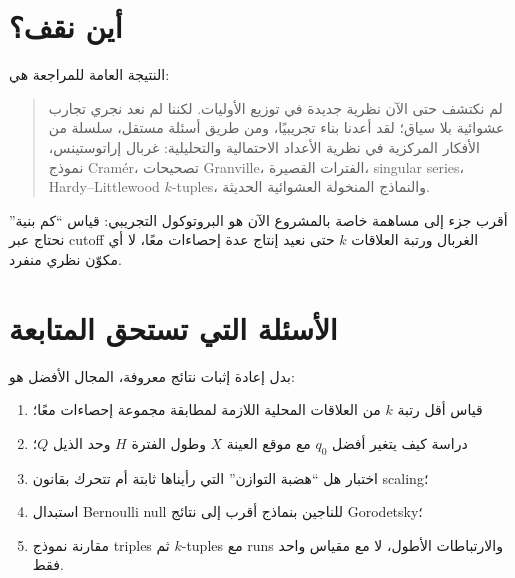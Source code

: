 \documentclass[12pt]{article}
\begin{document}
\section{أين نقف؟}
النتيجة العامة للمراجعة هي:
\begin{quote}
لم نكتشف حتى الآن نظرية جديدة في توزيع الأوليات. لكننا لم نعد نجري تجارب عشوائية بلا سياق؛ لقد أعدنا بناء تجريبيًا، ومن طريق أسئلة مستقل، سلسلة من الأفكار المركزية في نظرية الأعداد الاحتمالية والتحليلية: غربال إراتوستينس، نموذج Cram\'er، تصحيحات Granville، الفترات القصيرة، singular series، Hardy--Littlewood $k$-tuples، والنماذج المنخولة العشوائية الحديثة.
\end{quote}

أقرب جزء إلى مساهمة خاصة بالمشروع الآن هو البروتوكول التجريبي: قياس ``كم بنية'' نحتاج عبر cutoff الغربال ورتبة العلاقات $k$ حتى نعيد إنتاج عدة إحصاءات معًا، لا أي مكوّن نظري منفرد.

\section{الأسئلة التي تستحق المتابعة}
بدل إعادة إثبات نتائج معروفة، المجال الأفضل هو:
\begin{enumerate}
\item قياس أقل رتبة $k$ من العلاقات المحلية اللازمة لمطابقة مجموعة إحصاءات معًا؛
\item دراسة كيف يتغير أفضل $q_0$ مع موقع العينة $X$ وطول الفترة $H$ وحد الذيل $Q$؛
\item اختبار هل ``هضبة التوازن'' التي رأيناها ثابتة أم تتحرك بقانون scaling؛
\item استبدال Bernoulli null للناجين بنماذج أقرب إلى نتائج Gorodetsky؛
\item مقارنة نموذج triples ثم $k$-tuples مع runs والارتباطات الأطول، لا مع مقياس واحد فقط.
\end{enumerate}
\end{document}
